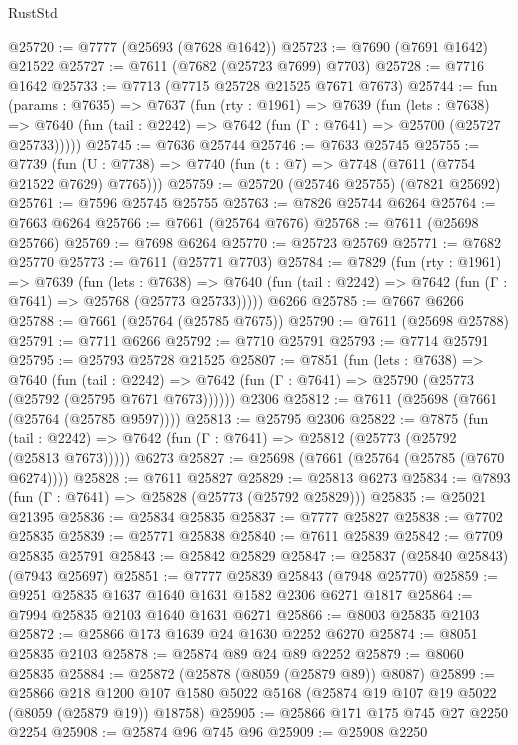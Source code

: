 \begin{lexlean}{RustStd}
\begin{coremodule}
@25720 := @7777 (@25693 (@7628 @1642))
@25723 := @7690 (@7691 @1642) @21522
@25727 := @7611 (@7682 (@25723 @7699) @7703)
@25728 := @7716 @1642
@25733 := @7713 (@7715 @25728 @21525 @7671 @7673)
@25744 := fun (params : @7635) =>
  @7637
    (fun (rty : @1961) =>
    @7639
      (fun (lets : @7638) =>
      @7640 (fun (tail : @2242) => @7642 (fun (Γ : @7641) => @25700 (@25727 @25733)))))
@25745 := @7636 @25744
@25746 := @7633 @25745
@25755 := @7739
    (fun (U : @7738) => @7740 (fun (t : @7) => @7748 (@7611 (@7754 @21522 @7629) @7765)))
@25759 := @25720 (@25746 @25755) (@7821 @25692)
@25761 := @7596 @25745 @25755
@25763 := @7826 @25744 @6264
@25764 := @7663 @6264
@25766 := @7661 (@25764 @7676)
@25768 := @7611 (@25698 @25766)
@25769 := @7698 @6264
@25770 := @25723 @25769
@25771 := @7682 @25770
@25773 := @7611 (@25771 @7703)
@25784 := @7829
    (fun (rty : @1961) =>
    @7639
      (fun (lets : @7638) =>
      @7640 (fun (tail : @2242) => @7642 (fun (Γ : @7641) => @25768 (@25773 @25733)))))
    @6266
@25785 := @7667 @6266
@25788 := @7661 (@25764 (@25785 @7675))
@25790 := @7611 (@25698 @25788)
@25791 := @7711 @6266
@25792 := @7710 @25791
@25793 := @7714 @25791
@25795 := @25793 @25728 @21525
@25807 := @7851
    (fun (lets : @7638) =>
    @7640
      (fun (tail : @2242) =>
      @7642 (fun (Γ : @7641) => @25790 (@25773 (@25792 (@25795 @7671 @7673))))))
    @2306
@25812 := @7611 (@25698 (@7661 (@25764 (@25785 @9597))))
@25813 := @25795 @2306
@25822 := @7875
    (fun (tail : @2242) => @7642 (fun (Γ : @7641) => @25812 (@25773 (@25792 (@25813 @7673)))))
    @6273
@25827 := @25698 (@7661 (@25764 (@25785 (@7670 @6274))))
@25828 := @7611 @25827
@25829 := @25813 @6273
@25834 := @7893 (fun (Γ : @7641) => @25828 (@25773 (@25792 @25829)))
@25835 := @25021 @21395
@25836 := @25834 @25835
@25837 := @7777 @25827
@25838 := @7702 @25835
@25839 := @25771 @25838
@25840 := @7611 @25839
@25842 := @7709 @25835 @25791
@25843 := @25842 @25829
@25847 := @25837 (@25840 @25843) (@7943 @25697)
@25851 := @7777 @25839 @25843 (@7948 @25770)
@25859 := @9251 @25835 @1637 @1640 @1631 @1582 @2306 @6271 @1817
@25864 := @7994 @25835 @2103 @1640 @1631 @6271
@25866 := @8003 @25835 @2103
@25872 := @25866 @173 @1639 @24 @1630 @2252 @6270
@25874 := @8051 @25835 @2103
@25878 := @25874 @89 @24 @89 @2252
@25879 := @8060 @25835
@25884 := @25872 (@25878 (@8059 (@25879 @89)) @8087)
@25899 := @25866
    @218
    @1200
    @107
    @1580
    @5022
    @5168
    (@25874 @19 @107 @19 @5022 (@8059 (@25879 @19)) @18758)
@25905 := @25866 @171 @175 @745 @27 @2250 @2254
@25908 := @25874 @96 @745 @96
@25909 := @25908 @2250

\end{coremodule}
\end{lexlean}
